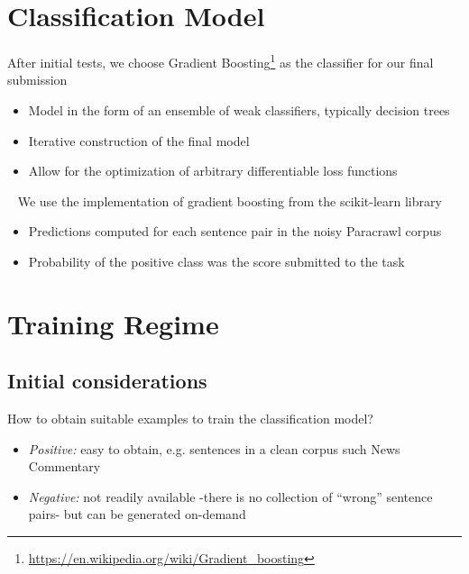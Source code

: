 \documentclass[a0]{sciposter}
\begin{document}
\begin{multicols*}{2}
\section*{\Large Classification Model}
After initial tests, we choose Gradient Boosting\footnote{\url{https://en.wikipedia.org/wiki/Gradient_boosting}} as the classifier for our final submission
\begin{itemize}
  \item Model in the form of an ensemble of weak classifiers, typically decision trees
  \item Iterative construction of the final model
  \item Allow for the optimization of arbitrary differentiable loss functions
\end{itemize}

~\newline
We use the implementation of gradient boosting from the scikit-learn library %
\begin{itemize}
  \item Predictions computed for each sentence pair in the noisy Paracrawl corpus
  \item Probability of the positive class was the score submitted to the task
\end{itemize}


\section*{\Large Training Regime}
\subsection*{Initial considerations} 
How to obtain suitable examples to train the classification model?
\begin{itemize}
  \item \textit{Positive:} easy to obtain, e.g. sentences in a clean corpus such News Commentary
  \item \textit{Negative:} not readily available -there is no collection of ``wrong'' sentence pairs- but can be generated on-demand
\end{itemize}


\end{multicols*}
\end{document}
